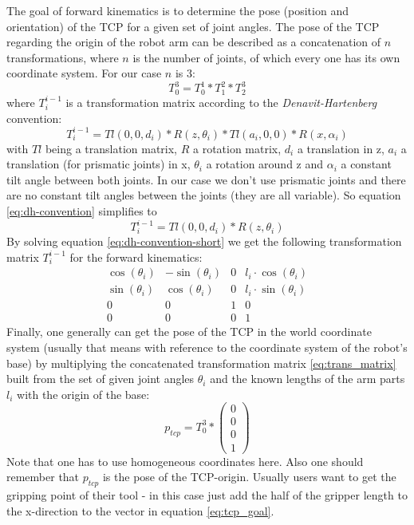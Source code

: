 \documentclass[conference]{IEEEtran}
\begin{document}
\par
The goal of forward kinematics is to determine the pose (position and orientation) of the TCP for a given set of joint angles. The pose of the TCP regarding the origin of the robot arm can be described as a concatenation of $n$ transformations, where $n$ is the number of joints, of which every one has its own coordinate system. For our case $n$ is 3:
\begin{equation}\label{eq:trans_matrix}
T_0^3 = T_0^1 * T_1^2 * T_2^3
\end{equation}
where $T_i^{i-1}$ is a transformation matrix according to the \textit{Denavit-Hartenberg} convention:
\begin{equation}\label{eq:dh-convention}
T_i^{i-1} = Tl(0,0,d_i) * R(z, \theta_i) * Tl(a_i,0,0) * R(x, \alpha_i)
\end{equation}
with $Tl$ being a translation matrix, $R$ a rotation matrix, $d_i$ a translation in z, $a_i$ a translation (for prismatic joints) in x, $\theta_i$ a rotation around z and $\alpha_i$ a constant tilt angle between both joints. In our case we don't use prismatic joints and there are no constant tilt angles between the joints (they are all variable). So equation \ref{eq:dh-convention} simplifies to 
\begin{equation}\label{eq:dh-convention-short}
T_i^{i-1} = Tl(0,0,d_i) * R(z, \theta_i)
\end{equation}
By solving equation \ref{eq:dh-convention-short} we get the following transformation matrix $T_i^{i-1}$ for the forward kinematics:
\[
\begin{matrix}
\cos(\theta_i) & -\sin(\theta_i) & 0 & l_i \cdot \cos(\theta_i)  \\
\sin(\theta_i) & \cos(\theta_i) & 0 & l_i \cdot \sin(\theta_i) \\
0 & 0 & 1 & 0 \\
0 & 0 & 0 & 1
\end{matrix}
\]
Finally, one generally can get the pose of the TCP in the world coordinate system (usually that means with reference to the coordinate system of the robot's base) by multiplying the concatenated transformation matrix \ref{eq:trans_matrix} built from the set of given joint angles $\theta_i$ and the known lengths of the arm parts $l_i$ with the origin of the base:
\begin{equation}\label{eq:tcp_goal}
p_{tcp} = T_0^3 * \begin{pmatrix}0\\0\\0\\1\end{pmatrix}
\end{equation}
Note that one has to use homogeneous coordinates here. Also one should remember that $p_{tcp}$ is the pose of the TCP-origin. Usually users want to get the gripping point of their tool - in this case just add the half of the gripper length to the x-direction to the vector in equation \ref{eq:tcp_goal}.
\\
\par
\end{document}
